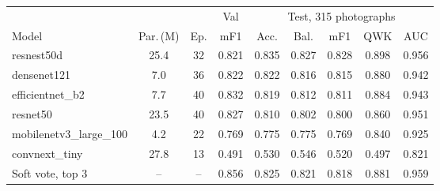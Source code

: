 \begin{tabular}{@{}lccc@{\hspace{6pt}}ccccc@{}}
\toprule
 & & & Val & \multicolumn{5}{c}{Test, 315 photographs}\\
\cmidrule(l){5-9}
Model & Par.\,(M) & Ep. & mF1 & Acc. & Bal. & mF1 & QWK & AUC\\
\midrule
resnest50d & 25.4 & 32 & 0.821 & 0.835 & 0.827 & 0.828 & 0.898 & 0.956 \\
densenet121 & 7.0 & 36 & 0.822 & 0.822 & 0.816 & 0.815 & 0.880 & 0.942 \\
efficientnet\_b2 & 7.7 & 40 & 0.832 & 0.819 & 0.812 & 0.811 & 0.884 & 0.943 \\
resnet50 & 23.5 & 40 & 0.827 & 0.810 & 0.802 & 0.800 & 0.860 & 0.951 \\
mobilenetv3\_large\_100 & 4.2 & 22 & 0.769 & 0.775 & 0.775 & 0.769 & 0.840 & 0.925 \\
convnext\_tiny & 27.8 & 13 & 0.491 & 0.530 & 0.546 & 0.520 & 0.497 & 0.821 \\
\midrule
Soft vote, top 3 & -- & -- & 0.856 & 0.825 & 0.821 & 0.818 & 0.881 & 0.959 \\
\bottomrule
\end{tabular}
